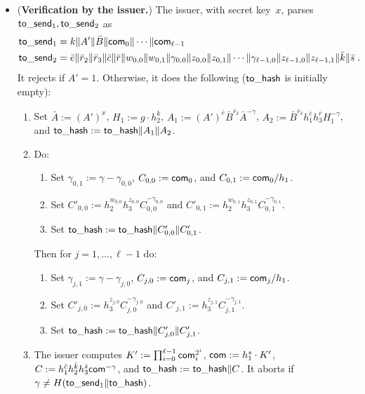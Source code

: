 \documentclass[11pt]{article}
\def\com{{\sf com}}
\def\send{{\sf to}\mbox{\_}{\sf send}}
\def\hash{{\sf to}\mbox{\_}{\sf hash}}
\begin{document}
\begin{itemize}
\begin{enumerate}
    \end{enumerate}
            \item ({\bf Verification by the issuer.}) The issuer, with secret key~$x$, parses $\send_1, \send_2$ as
            \begin{eqnarray*} & \send_1 = k\|A'\|\bar B\|\com_0\|\cdots\|\com_{\ell-1} & \\
            &\send_2 = \bar e \| \bar r_2\|\bar r_3\|\bar c \| \bar r\| w_{0,0}\|w_{0,1}\| \gamma_{0,0}\|z_{0,0}\|z_{0,1}\|\cdots \| \gamma_{\ell-1,0}\|z_{\ell-1,0}\|z_{\ell-1,1}\|\bar k\|\bar s \; .&
            \end{eqnarray*}
It rejects if $A'=1$. Otherwise, it does the following ($\hash$ is initially empty):
\begin{enumerate}
    \item Set $\bar A:=(A')^x$, $H_1:=g \cdot h_2^k$, $A_1:= (A')^{\bar e} \bar B^{\bar r_2} \bar A^{-\gamma}$, $A_2:= \bar B^{\bar r_3} h_1^{\bar c} h_3^{\bar r} H_1^{-\gamma}$, and $\hash:=\hash\|A_1\|A_2$. 
    \item Do:
           \begin{enumerate}
           \item Set $\gamma_{0,1}:=\gamma-\gamma_{0,0}$, $C_{0,0}:=\com_0$, and  $C_{0,1}:=\com_0/h_1$.
           \item Set $C'_{0,0}:=h_2^{w_{0,0}} h_3^{z_{0,0}} C_{0,0}^{-\gamma_{0,0}}$ and $C'_{0,1}:=h_2^{w_{0,1}} h_3^{z_{0,1}}C_{0,1}^{-\gamma_{0,1}}$.
           \item Set $\hash:=\hash\|C'_{0,0}\|C'_{0,1}$.
       \end{enumerate}
       Then for $j=1, \ldots, \ell-1$ do:
              \begin{enumerate}
           \item Set $\gamma_{j,1}:=\gamma-\gamma_{j,0}$, $C_{j,0}:=\com_j$, and  $C_{j,1}:=\com_j/h_1$.
           \item Set $C'_{j,0}:=h_3^{z_{j,0}} C_{j,0}^{-\gamma_{j,0}}$ and $C'_{j,1}:=h_3^{z_{j,1}}C_{j,1}^{-\gamma_{j,1}}$.
           \item Set $\hash:=\hash\|C'_{j,0}\|C'_{j,1}$.
       \end{enumerate}
       \item The issuer computes $K':=\prod_{i=0}^{\ell-1} \com_i^{2^i}$, $\com:=h_1^s\cdot K'$, $C:=h_1^{\bar c} h_2^{\bar k} h_3^{\bar s} \com^{-\gamma}$, and $\hash:=\hash\|C$. It aborts if $\gamma \neq H(\send_1\|\hash)$.
\end{enumerate}


\end{itemize}
\end{document}

